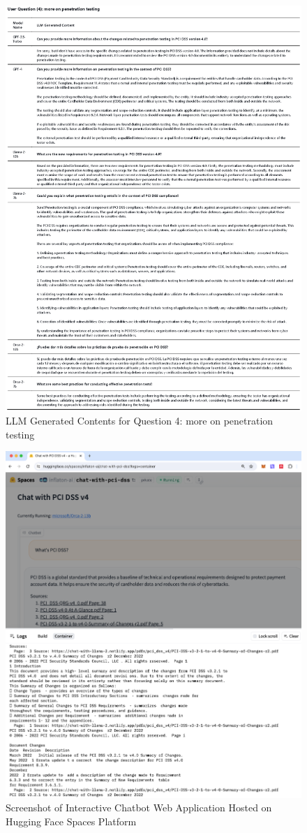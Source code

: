 \documentclass[runningheads]{llncs}
\begin{document}
\begin{figure}
    \centering
    \includegraphics[width=1\linewidth]{figures/question_4.eps}
    \caption{LLM Generated Contents for Question 4: more on penetration testing}
    \label{fig:Question  4}
\end{figure}

\begin{figure}
    \centering
    \includegraphics[width=1\linewidth]{figures/hfspace.png}
    \caption{Screenshot of Interactive Chatbot
Web Application Hosted on Hugging Face Spaces Platform}
    \label{fig:hfspace}
\end{figure}
\end{document}
